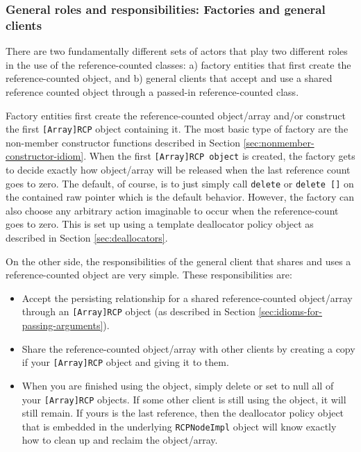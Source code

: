 \documentclass[pdf,ps2pdf,11pt]{SANDreport}
\begin{document}
%
{}\subsubsection{General roles and responsibilities: Factories and
general clients}
%

There are two fundamentally different sets of actors that play two
different roles in the use of the reference-counted classes: a)
factory entities that first create the reference-counted object, and
b) general clients that accept and use a shared reference counted
object through a passed-in reference-counted class.

Factory entities first create the reference-counted object/array
and/or construct the first {}\texttt{[Array]RCP} object containing it.
The most basic type of factory are the non-member constructor
functions described in Section
{}\ref{sec:nonmember-constructor-idiom}.  When the first
{}\texttt{[Array]RCP object} is created, the factory gets to decide
exactly how object/array will be released when the last reference
count goes to zero.  The default, of course, is to just simply call
{}\texttt{delete} or {}\texttt{delete []} on the contained raw pointer
which is the default behavior.  However, the factory can also choose
any arbitrary action imaginable to occur when the reference-count goes
to zero.  This is set up using a template deallocator policy object as
described in Section {}\ref{sec:deallocators}.

On the other side, the responsibilities of the general client that
shares and uses a reference-counted object are very simple.  These
responsibilities are:

\begin{itemize}

{}\item Accept the persisting relationship for a shared
reference-counted object/array through an {}\texttt{[Array]RCP} object
(as described in Section {}\ref{sec:idioms-for-passing-arguments}).

{}\item Share the reference-counted object/array with other clients by
creating a copy if your {}\texttt{[Array]RCP} object and giving it to
them.

{}\item When you are finished using the object, simply delete or set
to null all of your {}\texttt{[Array]RCP} objects.  If some other
client is still using the object, it will still remain.  If yours is
the last reference, then the deallocator policy object that is
embedded in the underlying {}\texttt{RCPNodeImpl} object will know
exactly how to clean up and reclaim the object/array.

\end{itemize}
\end{document}

